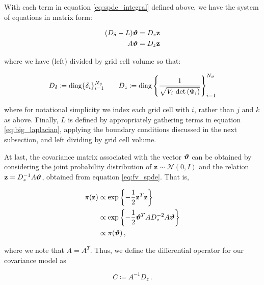 With each term in equation \eqref{eq:spde_integral} defined above, we have the system of
equations in matrix form:
\begin{linenomath}\begin{equation}
    \begin{aligned}
        (D_\delta - L) \bm{\vartheta} &= D_z\mathbf{z}\\
        A\bm{\vartheta} &= D_z\mathbf{z}
    \end{aligned}
    \label{eq:fv_spde}
\end{equation}\end{linenomath}
where we have (left) divided by grid cell volume so that:
\begin{linenomath*}\begin{equation*}
    \begin{aligned}
        D_\delta \coloneqq \text{diag}\{\delta_i\}_{i=1}^{N_{\vartheta}} \qquad
        D_z \coloneqq \text{diag}\left\{
            \dfrac{1}{\sqrt{V_i \,\, \text{det}\left(\Phi_{i}\right)}}
            \right\}_{i=1}^{N_{\vartheta}}
    \end{aligned}
\end{equation*}\end{linenomath*}
where for notational simplicity we index each grid cell with $i$, rather than
$j$ and $k$ as above.
Finally, $L$ is defined by appropriately gathering terms in
equation \eqref{eq:big_laplacian}, applying the boundary conditions discussed in the next
subsection, and left dividing by grid cell volume.

At last, the covariance matrix associated with the vector $\bm{\vartheta}$ can be
obtained by considering the joint probability distribution of
$\mathbf{z}\sim\mathcal{N}(0,I)$ and
the relation $\mathbf{z} = D_z^{-1}A\bm{\vartheta}$, obtained from
equation \eqref{eq:fv_spde}.
That is,
\begin{linenomath*}\begin{equation*}
    \begin{aligned}
        \pi(\mathbf{z})
        &\propto  \exp\left\{-\dfrac{1}{2}\mathbf{z}^T\mathbf{z}\right\} \\
        &\propto \exp\left\{-\dfrac{1}{2}\bm{\vartheta}^T A D_z^{-2} A \bm{\vartheta}\right\} \\
        &\propto \pi(\bm{\vartheta}) \, ,
    \end{aligned}
\end{equation*}\end{linenomath*}
where we note that $A=A^T$.
Thus, we define the differential operator for our covariance model as
\begin{linenomath*}\begin{equation*}
    C \coloneqq A^{-1} D_z \, .
\end{equation*}\end{linenomath*}
\\

